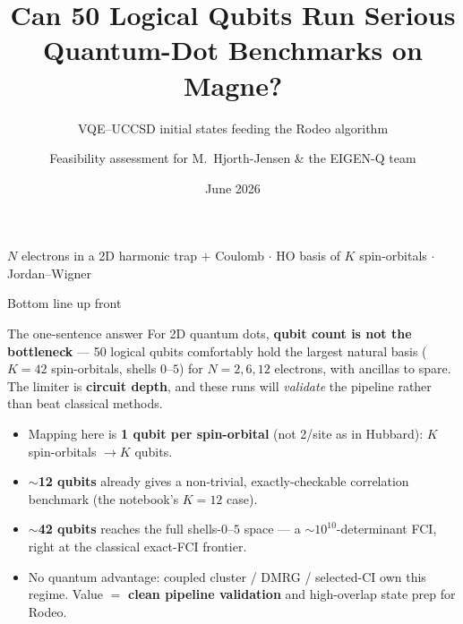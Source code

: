 \documentclass[aspectratio=169,11pt]{beamer}
\title{\large Can 50 Logical Qubits Run Serious\\ Quantum-Dot Benchmarks on Magne?}
\subtitle{\normalsize VQE--UCCSD initial states feeding the Rodeo algorithm}
\author{\small Feasibility assessment for M.~Hjorth-Jensen \& the EIGEN-Q team}
\date{\small June 2026}
\begin{document}
\begin{frame}[plain]
  \titlepage
  \begin{center}\small\color{qngray}
  $N$ electrons in a 2D harmonic trap $+$ Coulomb $\cdot$
  HO basis of $K$ spin-orbitals $\cdot$ Jordan--Wigner
  \end{center}
\end{frame}

\begin{frame}{Bottom line up front}
\begin{block}{The one-sentence answer}
For 2D quantum dots, \textbf{qubit count is not the bottleneck} --- 50 logical
qubits comfortably hold the largest natural basis ($K=42$ spin-orbitals, shells
$0$--$5$) for $N=2,6,12$ electrons, with ancillas to spare. The limiter is
\textbf{circuit depth}, and these runs will \emph{validate} the pipeline rather
than beat classical methods.
\end{block}
\vspace{2pt}
\begin{itemize}
  \item Mapping here is \textbf{1 qubit per spin-orbital} (not 2/site as in Hubbard):
        $K$ spin-orbitals $\to K$ qubits.
  \item \textbf{$\sim$12 qubits} already gives a non-trivial, exactly-checkable
        correlation benchmark (the notebook's $K=12$ case).
  \item \textbf{$\sim$42 qubits} reaches the full shells-$0$--$5$ space --- a
        $\sim\!10^{10}$-determinant FCI, right at the classical exact-FCI frontier.
  \item No quantum advantage: coupled cluster / DMRG / selected-CI own this regime.
        Value $=$ \textbf{clean pipeline validation} and high-overlap state prep for Rodeo.
\end{itemize}
\end{frame}
\end{document}
